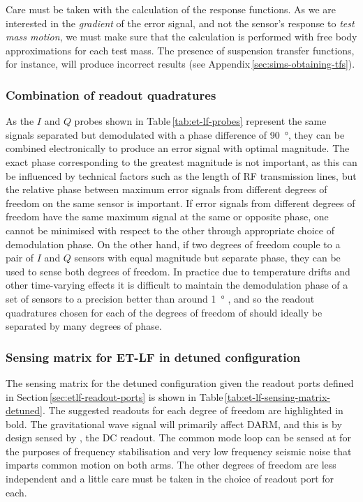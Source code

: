 Care must be taken with the calculation of the response functions. As we are interested in the \emph{gradient} of the error signal, and not the sensor's response to \emph{test mass motion}, we must make sure that the calculation is performed with free body approximations for each test mass. The presence of suspension transfer functions, for instance, will produce incorrect results (see Appendix\,\ref{sec:sims-obtaining-tfs}).

\subsubsection{Combination of readout quadratures}
As the $I$ and $Q$ probes shown in Table\,\ref{tab:et-lf-probes} represent the same signals separated but demodulated with a phase difference of \SI{90}{\degree}, they can be combined electronically to produce an error signal with optimal magnitude. The exact phase corresponding to the greatest magnitude is not important, as this can be influenced by technical factors such as the length of \gls{RF} transmission lines, but the relative phase between maximum error signals from different degrees of freedom on the same sensor is important. If error signals from different degrees of freedom have the same maximum signal at the same or opposite phase, one cannot be minimised with respect to the other through appropriate choice of demodulation phase. On the other hand, if two degrees of freedom couple to a pair of $I$ and $Q$ sensors with equal magnitude but separate phase, they can be used to sense both degrees of freedom. In practice due to temperature drifts and other time-varying effects it is difficult to maintain the demodulation phase of a set of sensors to a precision better than around \SI{1}{\degree} \cite{Effler2014}, and so the readout quadratures chosen for each of the degrees of freedom of \ETLF{} should ideally be separated by many degrees of phase.

\subsubsection{Sensing matrix for ET-LF in detuned configuration}
The sensing matrix for the detuned configuration given the readout ports defined in Section\,\ref{sec:etlf-readout-ports} is shown in Table\,\ref{tab:et-lf-sensing-matrix-detuned}. The suggested readouts for each degree of freedom are highlighted in bold. The gravitational wave signal will primarily affect \gls{DARM}, and this is by design sensed by \ASDC{}, the \gls{DC} readout. The common mode loop can be sensed at \REFLFIRSTQ{} for the purposes of frequency stabilisation and very low frequency seismic noise that imparts common motion on both arms. The other degrees of freedom are less independent and a little care must be taken in the choice of readout port for each.

